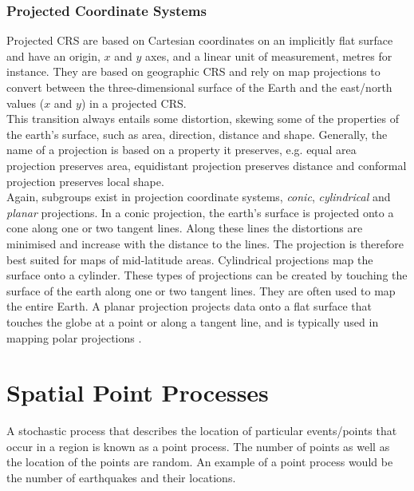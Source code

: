 \subsubsection*{Projected Coordinate Systems}
Projected CRS are based on Cartesian coordinates on an implicitly flat surface and have an origin, $x$ and $y$ axes, and a linear unit of measurement, metres for instance. They are based on geographic CRS and rely on map projections to convert between the three-dimensional surface of the Earth and the east/north values ($x$ and $y$) in a projected CRS.\\
This transition always entails some distortion, skewing some of the properties of the earth's surface, such as area, direction, distance and shape. Generally, the name of a projection is based on a property it preserves, e.g. equal area projection preserves area, equidistant projection preserves distance and conformal projection preserves local shape. \\
Again, subgroups exist in projection coordinate systems, \textit{conic}, \textit{cylindrical} and \textit{planar} projections. In a conic projection, the earth's surface is projected onto a cone along one or two tangent lines. Along these lines the distortions are minimised and increase with the distance to the lines. The projection is therefore best suited for maps of mid-latitude areas. Cylindrical projections map the surface onto a cylinder. These types of projections can be created by touching the surface of the earth along one or two tangent lines. They are often used to map the entire Earth. A planar projection projects data onto a flat surface that touches the globe at a point or along a tangent line, and is typically used in mapping polar projections \autocite[][]{lovelace2019geocomputation}.
\clearpage
\section{Spatial Point Processes}
A stochastic process that describes the location of particular events/points that occur in a region is known as a point process. The number of points as well as the location of the points are random. An example of a point process would be the number of earthquakes and their locations.
